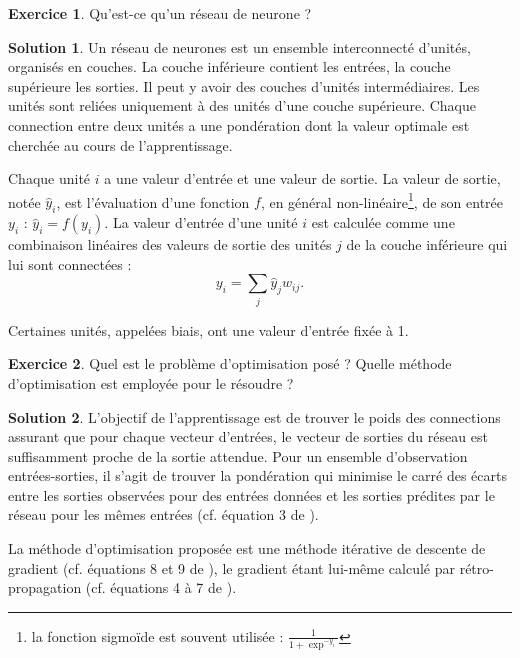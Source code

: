 \documentclass[a4paper,francais]{article}
\theoremstyle{definition}
\newtheorem{exercice}{Exercice}[section]
\newtheorem*{solution}{Solution}
\begin{document}
\begin{exercice}
Qu'est-ce qu'un réseau de neurone ?
\end{exercice}

\begin{solution}
  Un réseau de neurones est un ensemble interconnecté d'unités, organisés en couches.
  La couche inférieure contient les entrées, la couche supérieure les sorties.
  Il peut y avoir des couches d'unités intermédiaires. Les unités sont reliées
  uniquement à des unités d'une couche supérieure. Chaque connection entre deux unités
  a une pondération dont la valeur optimale est cherchée au cours de l'apprentissage. 

  Chaque unité $i$ a une valeur d'entrée et une valeur de sortie. La valeur de sortie, notée $\hat{y}_i$,
  est l'évaluation d'une fonction $f$, en général non-linéaire\footnote{la fonction
    sigmoïde est souvent utilisée : $\frac{1}{1 + \exp^{-y_i}}$},
  de son entrée $y_i$ : $\hat{y}_i = f( y_i )$.
  La valeur d'entrée d'une unité $i$ est calculée comme une combinaison linéaires
  des valeurs de sortie des unités $j$ de la couche inférieure qui lui sont connectées : 
  \begin{equation}
    \label{eq:entree}
    y_i = \sum_j \hat{y}_j w_{ij}. 
  \end{equation}

  Certaines unités, appelées biais, ont une valeur d'entrée fixée à 1.
\end{solution}

\begin{exercice}
Quel est le problème d'optimisation posé ?
Quelle méthode d'optimisation est employée pour le résoudre ?
\end{exercice}

\begin{solution}
  L'objectif de l'apprentissage est de trouver le poids des connections assurant que
  pour chaque vecteur d'entrées, le vecteur de sorties du réseau est suffisamment proche
  de la sortie attendue. Pour un ensemble d'observation entrées-sorties, il s'agit de
  trouver la pondération qui minimise le carré des écarts entre les sorties observées
  pour des entrées données et les sorties prédites par le réseau pour les mêmes entrées
  (cf. équation 3 de \cite{hinton86}).

  La méthode d'optimisation proposée est une méthode itérative de descente de gradient
  (cf. équations 8 et 9 de \cite{hinton86}), le gradient étant lui-même calculé par
  rétro-propagation (cf. équations 4 à 7 de \cite{hinton86}).
\end{solution}



\end{document}
